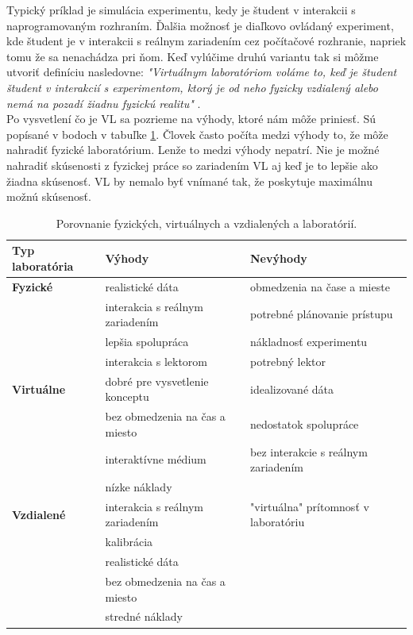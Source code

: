 Typický príklad je simulácia experimentu, kedy je študent v interakcii s naprogramovaným rozhraním. Ďalšia možnosť je diaľkovo ovládaný experiment, kde študent je v interakcii s reálnym zariadením cez počítačové rozhranie, napriek tomu že sa nenachádza pri ňom. 
Keď vylúčime druhú variantu tak si môžme utvoriť definíciu nasledovne: \textit{"Virtuálnym laboratóriom voláme to, keď je študent študent v interakcií s experimentom, ktorý je od neho fyzicky vzdialený alebo nemá na pozadí žiadnu fyzickú realitu"} \cite{hatherly}.\\

Po vysvetlení čo je VL sa pozrieme na výhody, ktoré nám môže priniesť. Sú popísané v bodoch v tabuľke \ref{table-real-remote-virtual-laboratory}.
Človek často počíta medzi výhody to, že môže nahradiť fyzické laboratórium. Lenže to medzi výhody nepatrí. Nie je možné nahradiť skúsenosti z fyzickej práce so zariadením VL aj keď je to lepšie ako žiadna skúsenosť. VL by nemalo byť vnímané tak, že poskytuje maximálnu možnú skúsenosť.\\

\begin{table}[H]
\small
\begin{tabular}{l l l}
\hline
\textbf{Typ laboratória} & \textbf{Výhody}  & \textbf{Nevýhody} \\ \hline
\textbf{Fyzické} & realistické dáta & obmedzenia na čase a mieste \\
& interakcia s reálnym zariadením & potrebné plánovanie prístupu\\
& lepšia spolupráca & nákladnosť experimentu \\
& interakcia s lektorom & potrebný lektor \\ \hline
\textbf{Virtuálne} & dobré pre vysvetlenie konceptu &  idealizované dáta\\
& bez obmedzenia na čas a miesto &  nedostatok spolupráce  \\
& interaktívne médium & bez interakcie s reálnym zariadením \\
& nízke náklady & \\ \hline
\textbf{Vzdialené} & interakcia s reálnym zariadením &  "virtuálna" prítomnosť v laboratóriu \\
& kalibrácia & \\
& realistické dáta & \\
& bez obmedzenia na čas a miesto & \\
& stredné náklady & \\ \hline
\end{tabular}
\caption{Porovnanie fyzických, virtuálnych a vzdialených a laboratórií.}
\label{table-real-remote-virtual-laboratory}
\end{table}

